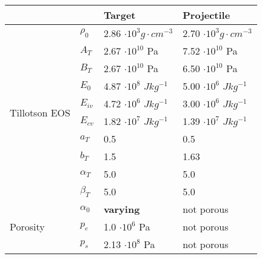 \begin{table}
    \centering
    \begin{tabular}{ |l|l|l|l| }
        \hline
        \multicolumn{2}{|c|}{}                & Target                  & Projectile                                                          \\
        \hline
        \multirow{10}{*}{Tillotson EOS}       & $\rho_0$                & 2.86 $\cdot 10^3 g\cdot cm^{-3}$ & 2.70 $\cdot 10^3 g\cdot cm^{-3}$ \\
                                              & $A_T$                   & 2.67 $\cdot 10^{10}$ Pa          & 7.52 $\cdot 10^{10}$ Pa          \\
                                              & $B_T$                   & 2.67 $\cdot 10^{10}$ Pa          & 6.50 $\cdot 10^{10}$ Pa          \\
                                              & $E_0$                   & 4.87 $\cdot 10^8$ $Jkg^{-1}$     & 5.00 $\cdot 10^6$ $Jkg^{-1}$     \\
                                              & $E_{iv}$                & 4.72 $\cdot 10^6$ $Jkg^{-1}$     & 3.00 $\cdot 10^6$ $Jkg^{-1}$     \\
                                              & $E_{cv}$                & 1.82 $\cdot 10^7$ $Jkg^{-1}$     & 1.39 $\cdot 10^7$ $Jkg^{-1}$     \\
                                              & $a_T$                   & 0.5                              & 0.5                              \\
                                              & $b_T$                   & 1.5                              & 1.63                             \\
                                              & $\alpha_T$              & 5.0                              & 5.0                              \\
                                              & $\beta_T$               & 5.0                              & 5.0                              \\ \hline
        \multirow{7}{*}{Porosity}             & $\alpha_0$              & \textbf{varying}                 & not porous                       \\
                                              & $p_{e}$                 & 1.0 $\cdot 10^6$ Pa              & not porous                       \\
                                              & $p_{s}$                 & 2.13 $\cdot 10^8$ Pa             & not porous                       \\

\end{tabular}
\end{table}
